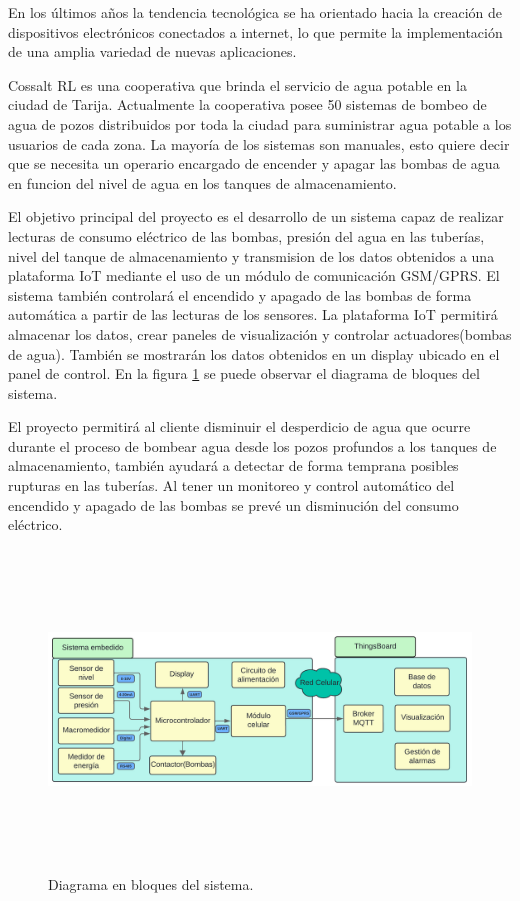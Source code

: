 \documentclass[
11pt, %
codirector, %
]{charter}
\begin{document}
En los últimos años la tendencia tecnológica se ha orientado hacia la creación de dispositivos electrónicos conectados a internet, lo que permite la implementación de una amplia variedad de nuevas aplicaciones.

Cossalt RL es una cooperativa que brinda el servicio de agua potable en la ciudad de Tarija. Actualmente la cooperativa posee 50 sistemas de bombeo de agua de pozos distribuidos por toda la ciudad para suministrar agua potable a los usuarios de cada zona. La mayoría de los sistemas son manuales, esto quiere decir que se necesita un operario encargado de encender y apagar las bombas de agua en funcion del nivel de agua en los tanques de almacenamiento.

El objetivo principal del proyecto es el desarrollo de un sistema capaz de realizar lecturas de consumo eléctrico de las bombas, presión del agua en las tuberías, nivel del tanque de almacenamiento y transmision de los datos obtenidos a una plataforma IoT mediante el uso de un módulo de comunicación GSM/GPRS. El sistema también controlará el encendido y apagado de las bombas de forma automática a partir de las lecturas de los sensores. La plataforma IoT permitirá almacenar los datos, crear paneles de visualización y controlar actuadores(bombas de agua). También se mostrarán los datos obtenidos en un display ubicado en el panel de control.
En la figura \ref{fig:diagra_sistema} se puede observar el diagrama de bloques del sistema.

El proyecto permitirá al cliente disminuir el desperdicio de agua que ocurre durante el proceso de bombear agua desde los pozos profundos a los tanques de almacenamiento, también ayudará a detectar de forma temprana posibles rupturas en las tuberías. Al tener un monitoreo y control automático del encendido y apagado de las bombas se prevé un disminución del consumo eléctrico.

\begin{figure}[hpb]
	\centering 
	\includegraphics[width=15cm, height=8.5cm]{./Figuras/d_sistema.png}
	\caption{Diagrama en bloques del sistema.}
	\label{fig:diagra_sistema}
\end{figure}
\vspace{2cm}
\end{document}

